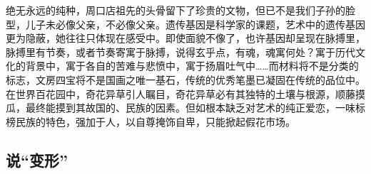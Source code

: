 \documentclass{article}
\begin{document}
绝无永远的纯种，周口店祖先的头骨留下了珍贵的文物，但已不是我们子孙的脸型，儿子未必像父亲，不必像父亲。遗传基因是科学家的课题，艺术中的遗传基因更为隐蔽，她往往只体现在感受中。即使面貌不像了，也许基因却呈现在脉搏里，脉搏里有节奏，或者节奏寄寓于脉搏，说得玄乎点，有魂，魂寓何处？寓于历代文化的背景中，寓于各自的苦难与悲愤中，寓于扬眉吐气中……而材料将不是分类的标志，文房四宝将不是国画之唯一基石，传统的优秀笔墨已凝固在传统的品位中。在世界百花园中，奇花异草引人瞩目，奇花异草必有其独特的土壤与根源，顺藤摸瓜，最终能摸到其故国的、民族的因素。但如根本缺乏对艺术的纯正爱恋，一味标榜民族的特色，强加于人，以自尊掩饰自卑，只能掀起假花市场。
\subsection{说“变形”}
\end{document}
